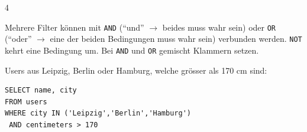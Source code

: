 \begin{landscape}
\begin{multicols*}{4}
\begin{cheatSheetBox}[title=Zeilen filtern: \texorpdfstring{\lstinline|WHERE|}{WHERE}]
\begin{table}[H]
  \centering
  \centering{}
\end{table}
\end{cheatSheetBox}
\begin{cheatSheetBox}[title=Filter kombinieren: \texorpdfstring{\lstinline|AND|, \lstinline|OR|, \lstinline|NOT|}{AND, OR, NOT}]
Mehrere Filter können mit \lstinline|AND| (\enquote{und} $\rightarrow$ beides muss wahr sein) oder \lstinline|OR| (\enquote{oder} $\rightarrow$ eine der beiden Bedingungen muss wahr sein) verbunden werden. \lstinline|NOT| kehrt eine Bedingung um. Bei \lstinline|AND| und \lstinline|OR| gemischt Klammern setzen.

Users aus Leipzig, Berlin oder Hamburg, welche grösser als 170 cm sind:
\begin{lstlisting}
SELECT name, city
FROM users
WHERE city IN ('Leipzig','Berlin','Hamburg')
 AND centimeters > 170
\end{lstlisting}
\end{cheatSheetBox}


\end{multicols*}
\end{landscape}
